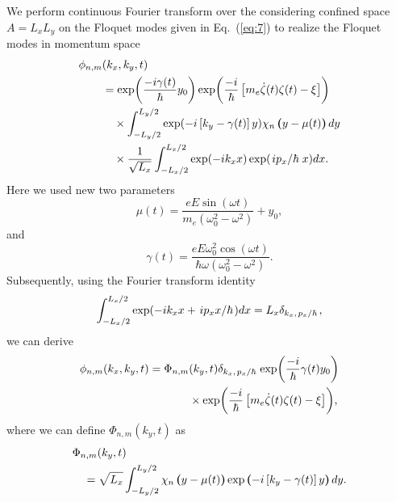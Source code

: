 \documentclass[
 reprint,
 amsmath,amssymb,
 aps,
 prb,
]{revtex4-2}
\begin{document}
We perform continuous Fourier transform over the considering confined space $A=L_xL_y$ on the Floquet modes given in Eq.~(\ref{eq:7}) to realize the Floquet modes in momentum space
\begin{equation} \label{eq:b8}
  \begin{aligned}
    \phi_{n,m}&(k_x,k_y,t) \\
    & =
    \exp(\frac{-i\gamma(t)}{\hbar}y_0)
    \exp(\frac{-i}{\hbar}\left[m_e \dot{\zeta}(t) \zeta(t) - \xi \right]) \\
    & \quad\times
    \int_{-L_y/2}^{L_y/2} \exp(-i \left[k_y - \gamma(t) \right]y)
      \chi_n \bm{\left(}y - \mu(t)\bm{\right)} dy \\
    & \quad\times
    \frac{1}{\sqrt{L_x}} \int_{-L_x/2}^{L_x/2}
     \exp(-ik_x x)\exp( \flatfrac{i p_x }{\hbar}x ) dx.
  \end{aligned}
\end{equation}
Here we used new two parameters
\begin{equation} \label{eq:b9}
  \mu(t) = \frac{eE\sin(\omega t)}{m_e(\omega_0^2 - \omega^2)} + y_0,
\end{equation}
and
\begin{equation} \label{eq:b10}
  \gamma(t) =
  \frac{eE\omega_0^2\cos(\omega t)}{\hbar\omega(\omega_0^2 - \omega^2)}.
\end{equation}
Subsequently, using the Fourier transform identity \cite{bruus04}
\begin{equation} \label{eq:b11}
  \int_{-L_x/2}^{L_x/2}
  \exp( -ik_x x + \flatfrac{i p_x x}{\hbar}) dx =
  L_x \delta_{k_x,\flatfrac{p_x}{\hbar}},
\end{equation}
we can derive
\begin{equation} \label{eq:b12}
  \begin{aligned}
    \phi_{n,m}(k_x,k_y,t)  =
    \Phi_{n,m}&(k_y,t)
    \delta_{k_x,\flatfrac{p_x}{\hbar}}
    \exp(\frac{-i}{\hbar} \gamma(t)y_0) \\
    & \times
    \exp(\frac{-i}{\hbar}
    \left[ m_e \dot{\zeta}(t) \zeta(t) - \xi \right]),
  \end{aligned}
\end{equation}
where we can define $\Phi_{n,m}(k_y,t)$ as
\begin{equation} \label{eq:b13}
  \begin{aligned}
    &\Phi_{n,m}(k_y,t) \\
    & \quad=
    \sqrt{L_x}
    \int_{-L_y/2}^{L_y/2}
    \chi_n \bm{\left(}y - \mu(t)\bm{\right)}
    \exp \bm{\left(}-i\left[k_y - \gamma(t) \right]y\bm{\right)} dy.
  \end{aligned}
\end{equation}
\end{document}
